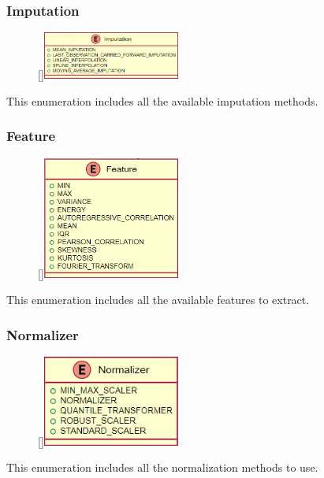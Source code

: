 \subsubsection{Imputation}
\label{Imputation}
\begin{figure}
    \raisebox{0pt}[\dimexpr{}\baselineskip\relax]{\includegraphics[width=4.5cm]{classes/model-management/5.png}}
\end{figure} 
\par
This enumeration includes all the available imputation methods.
\newline
\newline

\subsubsection{Feature}
\label{Feature}
\begin{figure}
    \raisebox{0pt}[\dimexpr{}\baselineskip\relax]{\includegraphics[width=4.5cm]{classes/model-management/6.png}}
\end{figure} 
\par
This enumeration includes all the available features to extract.
\newline
\newline

\subsubsection{Normalizer}
\label{Normalizer}
\begin{figure}
    \raisebox{0pt}[\dimexpr{}\baselineskip\relax]{\includegraphics[width=4.5cm]{classes/model-management/7.png}}
\end{figure} 
\par
This enumeration includes all the normalization methods to use.
\newline
\newline

